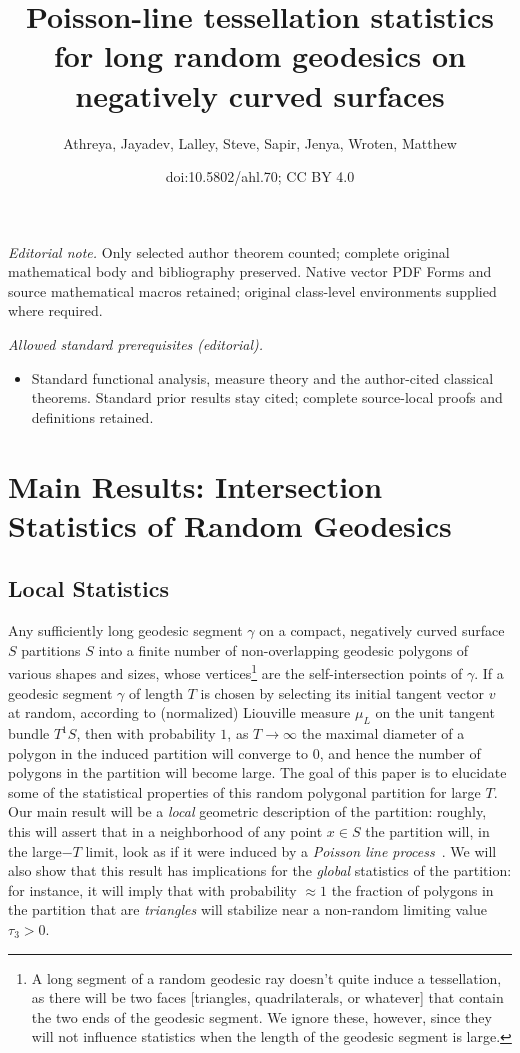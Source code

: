 \documentclass[10pt]{amsart}
\title{Poisson-line tessellation statistics for long random geodesics on negatively curved surfaces}
\author{Athreya, Jayadev, Lalley, Steve, Sapir, Jenya, Wroten, Matthew}
\date{doi:10.5802/ahl.70; CC BY 4.0}
\theoremstyle{definition}\newtheorem{defi}[theo]{Definition}\newtheorem{rema}[theo]{Remark}\newtheorem{exam}[theo]{Example}\newtheorem{exem}[theo]{Example}\newtheorem{nota}[theo]{Notation}
\begin{document}
\maketitle
\noindent\textit{Editorial note.} Only selected author theorem counted; complete original mathematical body and bibliography preserved. Native vector PDF Forms and source mathematical macros retained; original class-level environments supplied where required.\par\medskip
\noindent\textit{Allowed standard prerequisites (editorial).}\begin{itemize}
\item Standard functional analysis, measure theory and the author-cited classical theorems. Standard prior results stay cited; complete source-local proofs and definitions retained.
\end{itemize}\medskip

\section{Main Results: Intersection Statistics of Random Geodesics}\label{sec:local}

\subsection{Local Statistics}\label{ssec:local}
Any sufficiently long geodesic segment $\gamma$ on a compact, negatively curved surface $S$ partitions $S$ into a finite number of non-overlapping geodesic polygons of various shapes and sizes, whose vertices\footnote{A long segment of a random geodesic ray doesn't quite induce a tessellation, as there will be two faces [triangles, quadrilaterals, or whatever] that contain the two ends of the geodesic segment. We ignore these, however, since they will not influence statistics when the length of the geodesic segment is large.} are the self-intersection points of $\gamma$. If a geodesic segment $\gamma$ of length $T$ is chosen by selecting its initial tangent vector $v$ at random, according to (normalized) Liouville measure $\mu_{L}$ on the unit tangent bundle $T^1S$, then with probability $1$, as $T \rightarrow \infty$ the maximal diameter of a polygon in the induced partition will converge to $0$, and hence the number of polygons in the partition will become large. The goal of this paper is to elucidate some of the statistical properties of this random polygonal partition for large $T$. Our main result will be a \emph{local} geometric description of the partition: roughly, this will assert that in a neighborhood of any point $x\in S$ the partition will, in the large$-T$ limit, look as if it were induced by a
\emph{Poisson line process}~\cite{miles:pnas1,miles:pnas2}. We will also show that this result has implications for the \emph{global} statistics of the partition: for instance, it will imply that with probability $\approx 1$ the fraction of polygons in the partition that are \emph{triangles} will stabilize near a non-random limiting value $\tau_{3}>0$.
\end{document}
